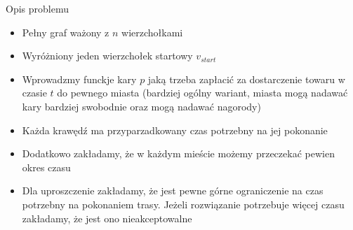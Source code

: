 \begin{frame}{Opis problemu}
	
	\begin{itemize}
		\item Pełny graf ważony z $n$ wierzchołkami
		\item Wyróżniony jeden wierzchołek startowy $v_{start}$
		\item Wprowadzmy funckje kary $p$ jaką trzeba zapłacić za dostarczenie towaru w czasie $t$ do pewnego miasta (bardziej ogólny wariant, miasta mogą nadawać kary bardziej swobodnie oraz mogą nadawać nagorody)
		\item Każda krawędź ma przyparzadkowany czas potrzebny na jej pokonanie
		\item Dodatkowo zakładamy, że w każdym mieście możemy przeczekać pewien okres czasu
		\item Dla uproszczenie zakładamy, że jest pewne górne ograniczenie na czas potrzebny na pokonaniem trasy. Jeżeli rozwiązanie potrzebuje więcej czasu zakładamy, że jest ono nieakceptowalne
	\end{itemize}
	
\end{frame}